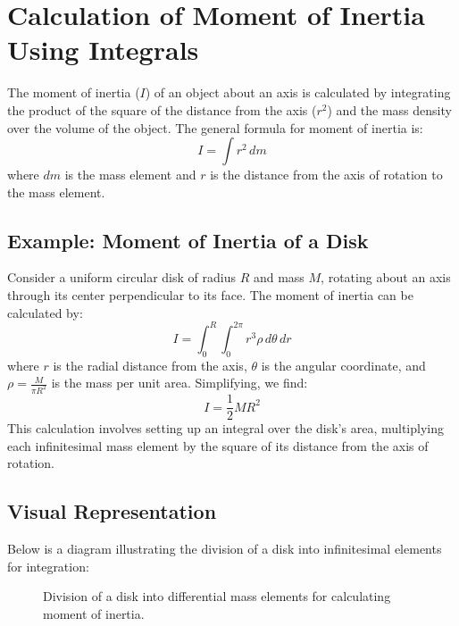 \documentclass[12pt]{article}
\begin{document}
\section{Calculation of Moment of Inertia Using Integrals}

The moment of inertia (\(I\)) of an object about an axis is calculated by integrating the product of the square of the distance from the axis (\(r^2\)) and the mass density over the volume of the object. The general formula for moment of inertia is:
\[
I = \int r^2 \, dm
\]
where \(dm\) is the mass element and \(r\) is the distance from the axis of rotation to the mass element.

\subsection{Example: Moment of Inertia of a Disk}
Consider a uniform circular disk of radius \(R\) and mass \(M\), rotating about an axis through its center perpendicular to its face. The moment of inertia can be calculated by:
\[
I = \int_0^R \int_0^{2\pi} r^3 \rho \, d\theta \, dr
\]
where \(r\) is the radial distance from the axis, \(\theta\) is the angular coordinate, and \(\rho = \frac{M}{\pi R^2}\) is the mass per unit area. Simplifying, we find:
\[
I = \frac{1}{2} MR^2
\]
This calculation involves setting up an integral over the disk's area, multiplying each infinitesimal mass element by the square of its distance from the axis of rotation.

\subsection{Visual Representation}
Below is a diagram illustrating the division of a disk into infinitesimal elements for integration:

\begin{figure}[h]
\centering
{}
\caption{Division of a disk into differential mass elements for calculating moment of inertia.}
\end{figure}
\end{document}
